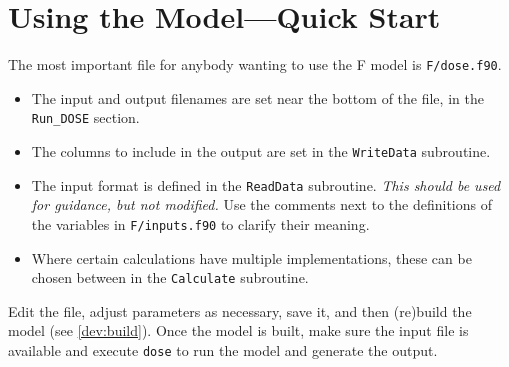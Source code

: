 


\section{Using the Model---Quick Start}

The most important file for anybody wanting to use the \DOSE{} F model is \verb|F/dose.f90|.

\begin{itemize}

\item The input and output filenames are set near the bottom of the file, in the \verb|Run_DOSE| 
section.

\item The columns to include in the output are set in the \verb|WriteData| subroutine.

\item The input format is defined in the \verb|ReadData| subroutine.  \emph{This should be used for 
guidance, but not modified.}  Use the comments next to the definitions of the variables in 
\verb|F/inputs.f90| to clarify their meaning.

\item Where certain calculations have multiple implementations, these can be chosen between in the 
\verb|Calculate| subroutine.

\end{itemize}

Edit the file, adjust parameters as necessary, save it, and then (re)build the model (see 
\ref{dev:build}).  Once the model is built, make sure the input file is available and execute 
\verb|dose| to run the model and generate the output.




